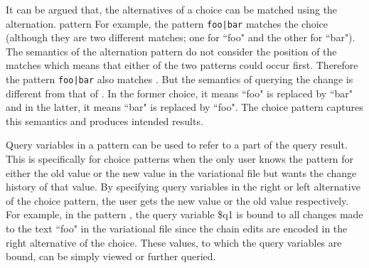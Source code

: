 It can be argued that, the alternatives of a choice can be matched using the alternation. pattern For example, the pattern \texttt{foo|bar} matches the choice (although they are two different matches; one for ``foo" and the other for ``bar"). The semantics of the alternation pattern do not consider the position of the matches which means that either of the two patterns could occur first. Therefore the pattern \texttt{foo|bar} also matches . But the semantics of querying the change  is different from that of . In the former choice, it means ``foo" is replaced by ``bar" and in the latter, it means ``bar" is replaced by ``foo". The choice pattern captures this semantics and produces intended results.

Query variables in a pattern can be used to refer to a part of the query result. This is specifically for choice patterns when the only user knows the pattern for either the old value or the new value in the variational file but wants the change history of that value. By specifying query variables in the right or left alternative of the choice pattern, the user gets the new value or the old value respectively. For example, in the pattern , the query variable \$q1 is bound to all changes made to the text ``foo" in the variational file since the chain edits are encoded in the right alternative of the choice. These values, to which the query variables are bound, can be simply viewed or further queried.

